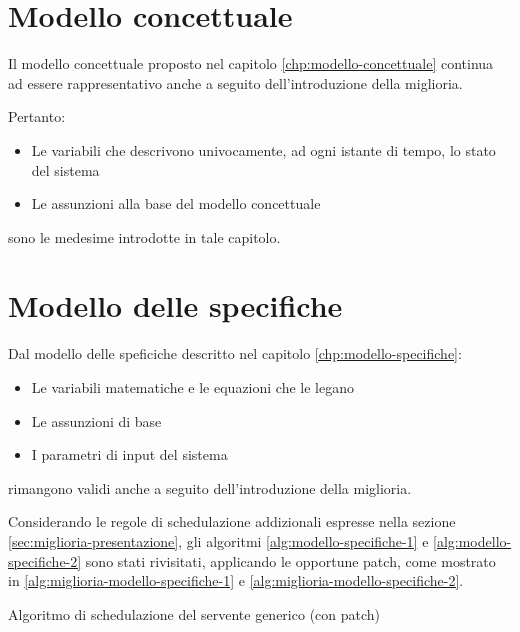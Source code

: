 \section{Modello concettuale}\label{sec:miglioria-modello-concettuale}
Il modello concettuale proposto nel capitolo \ref{chp:modello-concettuale} continua ad essere rappresentativo anche a seguito dell'introduzione della miglioria. 

Pertanto:
\begin{itemize}
\item Le variabili che descrivono univocamente, ad ogni istante di tempo, lo stato del sistema
\item Le assunzioni alla base del modello concettuale
\end{itemize}
sono le medesime introdotte in tale capitolo.
\section{Modello delle specifiche}\label{sec:miglioria-modello-specifiche}
Dal modello delle speficiche descritto nel capitolo \ref{chp:modello-specifiche}:
\begin{itemize}
\item Le variabili matematiche e le equazioni che le legano
\item Le assunzioni di base
\item I parametri di input del sistema
\end{itemize}
rimangono validi anche a seguito dell'introduzione della miglioria.

Considerando le regole di schedulazione addizionali espresse nella sezione \ref{sec:miglioria-presentazione}, gli algoritmi \ref{alg:modello-specifiche-1} e \ref{alg:modello-specifiche-2} sono stati rivisitati, applicando le opportune patch, come mostrato in \ref{alg:miglioria-modello-specifiche-1} e \ref{alg:miglioria-modello-specifiche-2}.

\begin{algorithm}[ht]
\SetAlgoLined
{}
\caption{Algoritmo di schedulazione del servente generico (con {\color{purple}patch})}
\label{alg:miglioria-modello-specifiche-1}
\end{algorithm}

